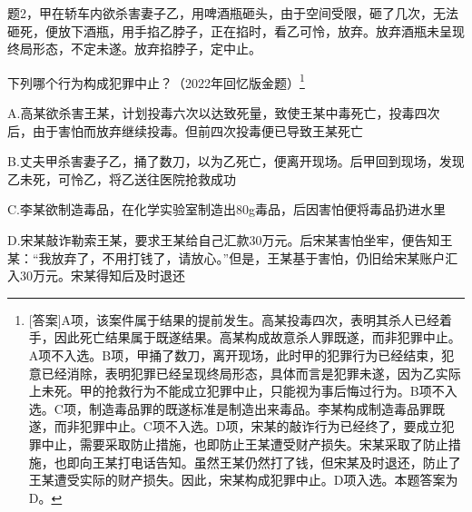 题2，甲在轿车内欲杀害妻子乙，用啤酒瓶砸头，由于空间受限，砸了几次，无法砸死，便放下酒瓶，用手掐乙脖子，正在掐时，看乙可怜，放弃。放弃酒瓶未呈现终局形态，不定未遂。放弃掐脖子，定中止。


下列哪个行为构成犯罪中止？（2022年回忆版金题）\footnote{[答案]A项，该案件属于结果的提前发生。高某投毒四次，表明其杀人已经着手，因此死亡结果属于既遂结果。高某构成故意杀人罪既遂，而非犯罪中止。A项不入选。B项，甲捅了数刀，离开现场，此时甲的犯罪行为已经结束，犯意已经消除，表明犯罪已经呈现终局形态，具体而言是犯罪未遂，因为乙实际上未死。甲的抢救行为不能成立犯罪中止，只能视为事后悔过行为。B项不入选。C项，制造毒品罪的既遂标准是制造出来毒品。李某构成制造毒品罪既遂，而非犯罪中止。C项不入选。D项，宋某的敲诈行为已经终了，要成立犯罪中止，需要采取防止措施，也即防止王某遭受财产损失。宋某采取了防止措施，也即向王某打电话告知。虽然王某仍然打了钱，但宋某及时退还，防止了王某遭受实际的财产损失。因此，宋某构成犯罪中止。D项入选。本题答案为D。}

A.高某欲杀害王某，计划投毒六次以达致死量，致使王某中毒死亡，投毒四次后，由于害怕而放弃继续投毒。但前四次投毒便已导致王某死亡

B.丈夫甲杀害妻子乙，捅了数刀，以为乙死亡，便离开现场。后甲回到现场，发现乙未死，可怜乙，将乙送往医院抢救成功

C.李某欲制造毒品，在化学实验室制造出80g毒品，后因害怕便将毒品扔进水里

D.宋某敲诈勒索王某，要求王某给自己汇款30万元。后宋某害怕坐牢，便告知王某：“我放弃了，不用打钱了，请放心。”但是，王某基于害怕，仍旧给宋某账户汇入30万元。宋某得知后及时退还


